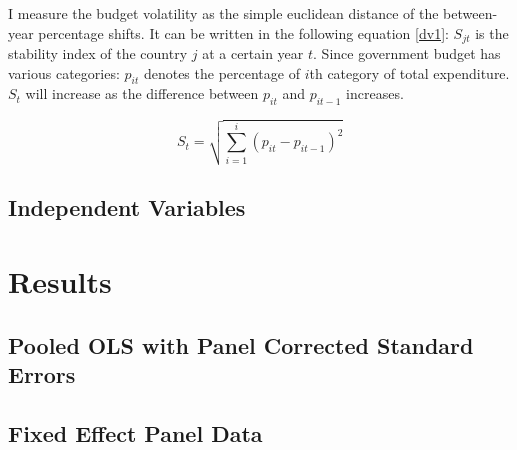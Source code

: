 \documentclass[12pt]{article}\usepackage[]{graphicx}\usepackage[]{color}
\begin{document}
I measure the budget volatility  as the simple euclidean distance of the between-year percentage shifts. It can be written in the following equation \ref{dv1}: $S_{jt}$ is the stability index of the country $j$ at a certain year $t$. Since government budget has various categories: $p_{it}$ denotes the percentage of $i$th category of total expenditure. $S_t$ will increase as the difference between $p_{it}$ and $p_{it-1}$ increases.

\begin{equation}
S_t = \sqrt{\sum_{i = 1}^i (p_{it} -p_{it-1})^2} 

\label{dv1}
\end{equation}








\subsection{Independent Variables}


\section{Results}


\subsection{Pooled OLS with Panel Corrected Standard Errors}




\subsection{Fixed Effect Panel Data}
\end{document}
